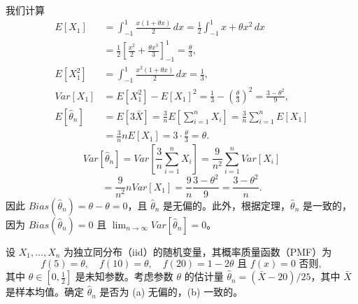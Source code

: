 \begin{questions}
\begin{solution}
我们计算
\begin{align*}
E[X_1] &= \int_{-1}^{1} \frac{x(1 + \theta x)}{2} \,dx = \frac{1}{2} \int_{-1}^{1} x + \theta x^2 \,dx \\
&= \frac{1}{2} \left[ \frac{x^2}{2} + \frac{\theta x^3}{3} \right]_{-1}^{1} = \frac{\theta}{3}, \\
E[X_1^2] &= \int_{-1}^{1} \frac{x^2(1 + \theta x)}{2} \,dx = \frac{1}{3}, \\
Var[X_1] &= E[X_1^2] - E[X_1]^2 = \frac{1}{3} - \left( \frac{\theta}{3} \right)^2 = \frac{3 - \theta^2}{9}, \\
E[\hat{\theta}_n] &= E[3\bar{X}] = \frac{3}{n} E\left[ \sum_{i=1}^n X_i \right] = \frac{3}{n} \sum_{i=1}^n E[X_1] \\
&= \frac{3}{n} n E[X_1] = 3 \cdot \frac{\theta}{3} = \theta.
\end{align*}
\[
Var[\hat{\theta}_n] = Var\left[ \frac{3}{n} \sum_{i=1}^n X_i \right] = \frac{9}{n^2} \sum_{i=1}^n Var[X_i]
\]
\[
= \frac{9}{n^2} n Var[X_1] = \frac{9}{n} \frac{3 - \theta^2}{9} = \frac{3 - \theta^2}{n}.
\]
因此 $Bias(\hat{\theta}_n) = \theta - \theta = 0$，且 $\hat{\theta}_n$ 是无偏的。此外，根据定理，$\hat{\theta}_n$ 是一致的，因为 $Bias(\hat{\theta}_n) = 0$ 且 $\lim_{n \to \infty} Var[\hat{\theta}_n] = 0$。
\end{solution}

\question
设 $X_1, \dots, X_n$ 为独立同分布（iid）的随机变量，其概率质量函数（PMF）为
\[
f(5) = \theta, \quad f(10) = \theta, \quad f(20) = 1 - 2\theta \text{ 且 } f(x) = 0 \text{ 否则},
\]
其中 $\theta \in [0, \frac{1}{2}]$ 是未知参数。考虑参数 $\theta$ 的估计量 $\hat{\theta}_n = (\bar{X} - 20)/25$，其中 $\bar{X}$ 是样本均值。确定 $\hat{\theta}_n$ 是否为 (a) 无偏的，(b) 一致的。


\end{questions}
